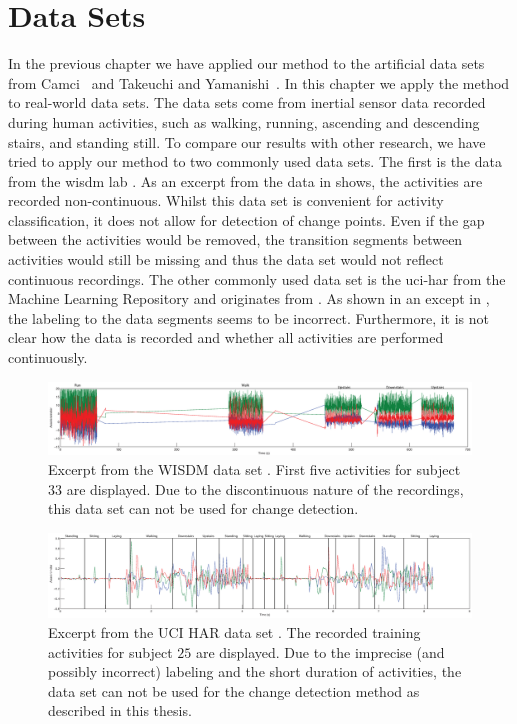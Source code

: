 \section{Data Sets}\label{sec:data_sets}
In the previous chapter we have applied our method to the artificial data sets from Camci~\cite{camci2010change} and Takeuchi and Yamanishi~\cite{takeuchi2006unifying}.
In this chapter we apply the method to real-world data sets.
The data sets come from inertial sensor data recorded during human activities, such as walking, running, ascending and descending stairs, and standing still.
To compare our results with other research, we have tried to apply our method to two commonly used data sets.
The first is the data from the \gls{wisdm} lab \cite{kwapisz2011activity}.
As an excerpt from the data in  shows, the activities are recorded non-continuous.
Whilst this data set is convenient for activity classification, it does not allow for detection of change points.
Even if the gap between the activities would be removed, the transition segments between activities would still be missing and thus the data set would not reflect continuous recordings.
The other commonly used data set is the \gls{uci-har} from the Machine Learning Repository and originates from \cite{anguita2012human}.
As shown in an except in , the labeling to the data segments seems to be incorrect.
Furthermore, it is not clear how the data is recorded and whether all activities are performed continuously.

\begin{figure}
\centering
  \includegraphics[width=1\textwidth]{./Figures/Chapter6/data_collection/wisdm_excerpt.eps}
  \caption[WISDM Excerpt]{Excerpt from the WISDM data set \cite{kwapisz2011activity}. First five activities for subject $33$ are displayed. Due to the discontinuous nature of the recordings, this data set can not be used for change detection.}
  \label{fig:wisdm_excerpt}
\end{figure}

\begin{figure}
\centering
  \includegraphics[width=1\textwidth]{./Figures/Chapter6/data_collection/uci_annotated.eps}
  \caption[UCI HAR Excerpt]{Excerpt from the UCI HAR data set \cite{anguita2012human}. The recorded training activities for subject $25$ are displayed. Due to the imprecise (and possibly incorrect) labeling and the short duration of activities, the data set can not be used for the change detection method as described in this thesis.}
  \label{fig:uci_annotated}
\end{figure}

